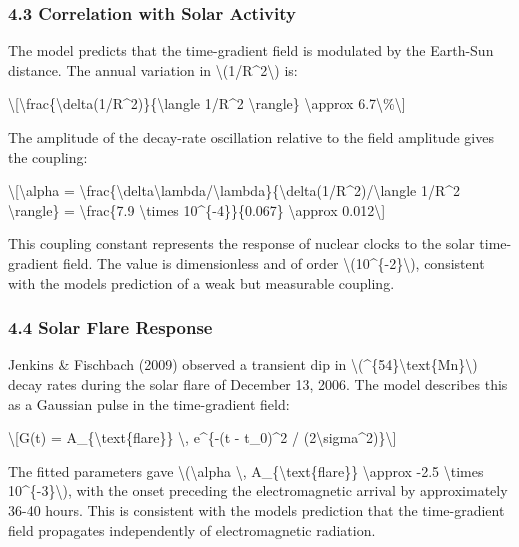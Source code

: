 \documentclass[
  10pt,
]{article}
\begin{document}
\hypertarget{correlation-with-solar-activity}{%
\subsubsection{4.3 Correlation with Solar
Activity}\label{correlation-with-solar-activity}}

The model predicts that the time-gradient field is modulated by the
Earth-Sun distance. The annual variation in
\textbackslash(1/R\^{}2\textbackslash) is:

\textbackslash{[}\textbackslash frac\{\textbackslash delta(1/R\^{}2)\}\{\textbackslash langle
1/R\^{}2 \textbackslash rangle\} \textbackslash approx
6.7\textbackslash\%\textbackslash{]}

The amplitude of the decay-rate oscillation relative to the field
amplitude gives the coupling:

\textbackslash{[}\textbackslash alpha =
\textbackslash frac\{\textbackslash delta\textbackslash lambda/\textbackslash lambda\}\{\textbackslash delta(1/R\^{}2)/\textbackslash langle
1/R\^{}2 \textbackslash rangle\} = \textbackslash frac\{7.9
\textbackslash times 10\^{}\{-4\}\}\{0.067\} \textbackslash approx
0.012\textbackslash{]}

This coupling constant represents the response of nuclear clocks to the
solar time-gradient field. The value is dimensionless and of order
\textbackslash(10\^{}\{-2\}\textbackslash), consistent with the
model\textquotesingle s prediction of a weak but measurable coupling.

\hypertarget{solar-flare-response}{%
\subsubsection{4.4 Solar Flare Response}\label{solar-flare-response}}

Jenkins \& Fischbach (2009) observed a transient dip in
\textbackslash(\^{}\{54\}\textbackslash text\{Mn\}\textbackslash) decay
rates during the solar flare of December 13, 2006. The model describes
this as a Gaussian pulse in the time-gradient field:

\textbackslash{[}G(t) = A\_\{\textbackslash text\{flare\}\}
\textbackslash, e\^{}\{-(t - t\_0)\^{}2 /
(2\textbackslash sigma\^{}2)\}\textbackslash{]}

The fitted parameters gave \textbackslash(\textbackslash alpha
\textbackslash, A\_\{\textbackslash text\{flare\}\}
\textbackslash approx -2.5 \textbackslash times
10\^{}\{-3\}\textbackslash), with the onset preceding the
electromagnetic arrival by approximately 36-40 hours. This is consistent
with the model\textquotesingle s prediction that the time-gradient field
propagates independently of electromagnetic radiation.
\end{document}
